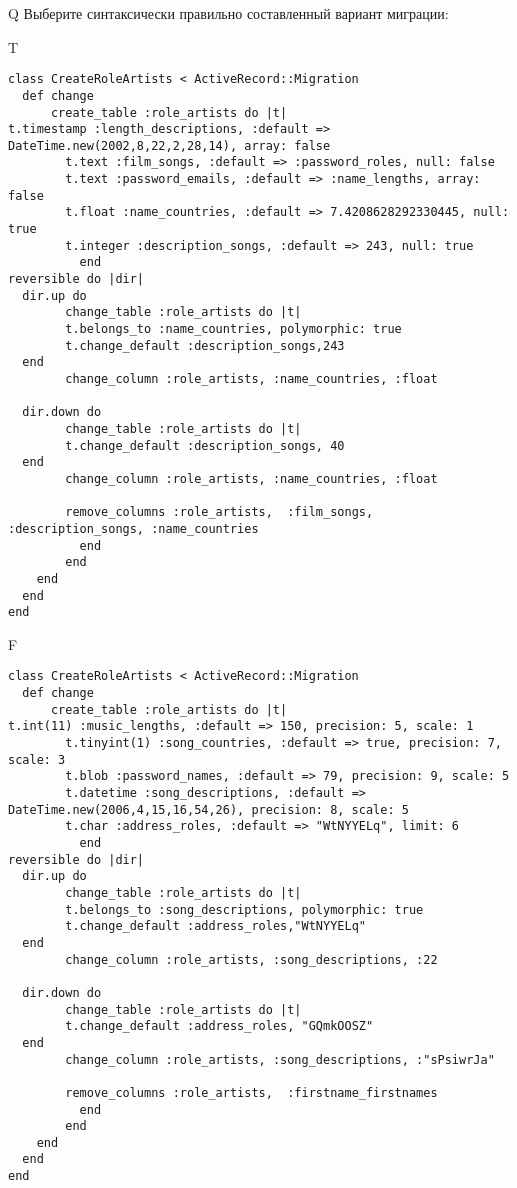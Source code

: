 Q
Выберите синтаксически правильно составленный вариант миграции:

T
\begin{verbatim}
class CreateRoleArtists < ActiveRecord::Migration
  def change
	  create_table :role_artists do |t|
t.timestamp :length_descriptions, :default => DateTime.new(2002,8,22,2,28,14), array: false
		t.text :film_songs, :default => :password_roles, null: false
		t.text :password_emails, :default => :name_lengths, array: false
		t.float :name_countries, :default => 7.4208628292330445, null: true
		t.integer :description_songs, :default => 243, null: true
		  end
reversible do |dir|
  dir.up do
		change_table :role_artists do |t|
		t.belongs_to :name_countries, polymorphic: true
 		t.change_default :description_songs,243
  end
 		change_column :role_artists, :name_countries, :float
   
  dir.down do
		change_table :role_artists do |t|
		t.change_default :description_songs, 40
  end
 		change_column :role_artists, :name_countries, :float
   
		remove_columns :role_artists,  :film_songs, :description_songs, :name_countries 
	      end
	    end
    end 
  end
end

\end{verbatim}

F
\begin{verbatim}
class CreateRoleArtists < ActiveRecord::Migration
  def change
	  create_table :role_artists do |t|
t.int(11) :music_lengths, :default => 150, precision: 5, scale: 1
		t.tinyint(1) :song_countries, :default => true, precision: 7, scale: 3
		t.blob :password_names, :default => 79, precision: 9, scale: 5
		t.datetime :song_descriptions, :default => DateTime.new(2006,4,15,16,54,26), precision: 8, scale: 5
		t.char :address_roles, :default => "WtNYYELq", limit: 6
		  end
reversible do |dir|
  dir.up do
		change_table :role_artists do |t|
		t.belongs_to :song_descriptions, polymorphic: true
 		t.change_default :address_roles,"WtNYYELq"
  end
 		change_column :role_artists, :song_descriptions, :22
   
  dir.down do
		change_table :role_artists do |t|
		t.change_default :address_roles, "GQmkOOSZ"
  end
 		change_column :role_artists, :song_descriptions, :"sPsiwrJa"
   
		remove_columns :role_artists,  :firstname_firstnames 
	      end
	    end
    end 
  end
end

\end{verbatim}

